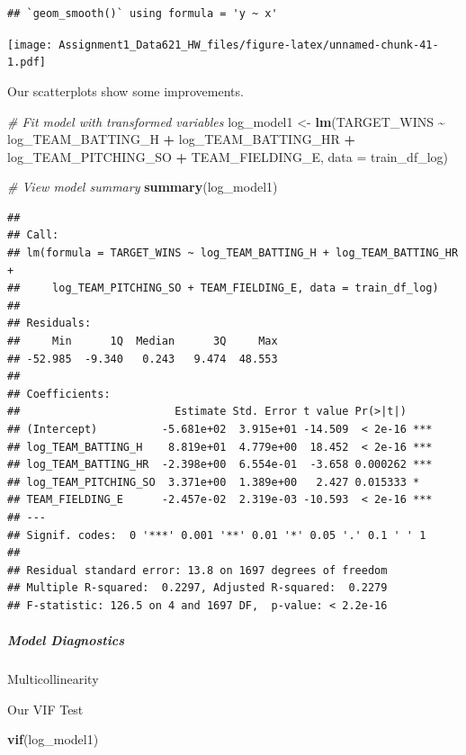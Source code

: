 \documentclass[
]{article}
\newenvironment{Shaded}{\begin{snugshade}}{\end{snugshade}}
\newcommand{\AttributeTok}[1]{\textcolor[rgb]{0.13,0.29,0.53}{#1}}
\newcommand{\CommentTok}[1]{\textcolor[rgb]{0.56,0.35,0.01}{\textit{#1}}}
\newcommand{\FunctionTok}[1]{\textcolor[rgb]{0.13,0.29,0.53}{\textbf{#1}}}
\newcommand{\NormalTok}[1]{#1}
\newcommand{\OtherTok}[1]{\textcolor[rgb]{0.56,0.35,0.01}{#1}}
\newcommand{\SpecialCharTok}[1]{\textcolor[rgb]{0.81,0.36,0.00}{\textbf{#1}}}
\begin{document}
\begin{verbatim}
## `geom_smooth()` using formula = 'y ~ x'
\end{verbatim}

\texttt{[image: Assignment1\_Data621\_HW\_files/figure-latex/unnamed-chunk-41-1.pdf]}

Our scatterplots show some improvements.

\begin{Shaded}
\begin{Highlighting}[]
\CommentTok{\# Fit model with transformed variables}
\NormalTok{log\_model1 }\OtherTok{\textless{}{-}} \FunctionTok{lm}\NormalTok{(TARGET\_WINS }\SpecialCharTok{\textasciitilde{}}\NormalTok{ log\_TEAM\_BATTING\_H }\SpecialCharTok{+}\NormalTok{ log\_TEAM\_BATTING\_HR }\SpecialCharTok{+}\NormalTok{ log\_TEAM\_PITCHING\_SO }\SpecialCharTok{+}\NormalTok{ TEAM\_FIELDING\_E, }\AttributeTok{data =}\NormalTok{ train\_df\_log)}

\CommentTok{\# View model summary}
\FunctionTok{summary}\NormalTok{(log\_model1)}
\end{Highlighting}
\end{Shaded}

\begin{verbatim}
## 
## Call:
## lm(formula = TARGET_WINS ~ log_TEAM_BATTING_H + log_TEAM_BATTING_HR + 
##     log_TEAM_PITCHING_SO + TEAM_FIELDING_E, data = train_df_log)
## 
## Residuals:
##     Min      1Q  Median      3Q     Max 
## -52.985  -9.340   0.243   9.474  48.553 
## 
## Coefficients:
##                        Estimate Std. Error t value Pr(>|t|)    
## (Intercept)          -5.681e+02  3.915e+01 -14.509  < 2e-16 ***
## log_TEAM_BATTING_H    8.819e+01  4.779e+00  18.452  < 2e-16 ***
## log_TEAM_BATTING_HR  -2.398e+00  6.554e-01  -3.658 0.000262 ***
## log_TEAM_PITCHING_SO  3.371e+00  1.389e+00   2.427 0.015333 *  
## TEAM_FIELDING_E      -2.457e-02  2.319e-03 -10.593  < 2e-16 ***
## ---
## Signif. codes:  0 '***' 0.001 '**' 0.01 '*' 0.05 '.' 0.1 ' ' 1
## 
## Residual standard error: 13.8 on 1697 degrees of freedom
## Multiple R-squared:  0.2297, Adjusted R-squared:  0.2279 
## F-statistic: 126.5 on 4 and 1697 DF,  p-value: < 2.2e-16
\end{verbatim}

\subparagraph{Model Diagnostics}\label{model-diagnostics}

Multicollinearity

Our VIF Test

\begin{Shaded}
\begin{Highlighting}[]
\FunctionTok{vif}\NormalTok{(log\_model1)}
\end{Highlighting}
\end{Shaded}
\end{document}
